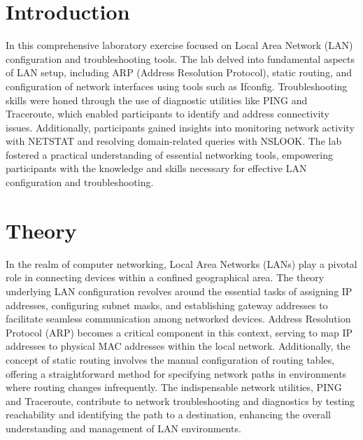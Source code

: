 \documentclass[11pt]{article}
\begin{document}
\section{Introduction}
In this comprehensive laboratory exercise focused on Local Area Network (LAN) configuration and troubleshooting tools. The lab delved into fundamental aspects of LAN setup, including ARP (Address Resolution Protocol), static routing, and configuration of network interfaces using tools such as Ifconfig. Troubleshooting skills were honed through the use of diagnostic utilities like PING and Traceroute, which enabled participants to identify and address connectivity issues. Additionally, participants gained insights into monitoring network activity with NETSTAT and resolving domain-related queries with NSLOOK. The lab fostered a practical understanding of essential networking tools, empowering participants with the knowledge and skills necessary for effective LAN configuration and troubleshooting.


\section{Theory}
In the realm of computer networking, Local Area Networks (LANs) play a pivotal role in connecting devices within a confined geographical area. The theory underlying LAN configuration revolves around the essential tasks of assigning IP addresses, configuring subnet masks, and establishing gateway addresses to facilitate seamless communication among networked devices. Address Resolution Protocol (ARP) becomes a critical component in this context, serving to map IP addresses to physical MAC addresses within the local network. Additionally, the concept of static routing involves the manual configuration of routing tables, offering a straightforward method for specifying network paths in environments where routing changes infrequently. The indispensable network utilities, PING and Traceroute, contribute to network troubleshooting and diagnostics by testing reachability and identifying the path to a destination, enhancing the overall understanding and management of LAN environments.
\end{document}

